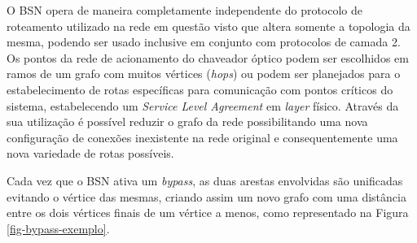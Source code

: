 \documentclass[conference]{IEEEtran}
\begin{document}
O BSN opera de maneira completamente independente do protocolo de roteamento utilizado na rede em questão visto que altera somente a topologia da mesma, podendo ser usado inclusive em conjunto com protocolos de camada 2. Os pontos da rede de acionamento do chaveador óptico podem ser escolhidos em ramos de um grafo com muitos vértices (\emph{hops}) ou podem ser planejados para o estabelecimento de rotas específicas para comunicação com pontos críticos do sistema, estabelecendo um \emph{Service Level Agreement} em \emph{layer} físico. Através da sua utilização é possível reduzir o grafo da rede possibilitando uma nova configuração de conexões inexistente na rede original e consequentemente uma nova variedade de rotas possíveis.

Cada vez que o BSN ativa um \emph{bypass}, as duas arestas envolvidas são unificadas evitando o vértice das mesmas, criando assim um novo grafo com uma distância entre os dois vértices finais de um vértice a menos, como representado na Figura \ref{fig-bypass-exemplo}.
\end{document}

